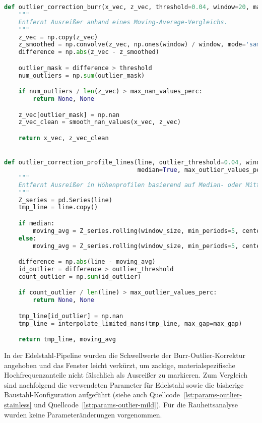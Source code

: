 \begin{lstlisting}[language=Python, caption={Outlier Detection/Correction in der Profilvorverarbeitung (Burr-Kanal)}, label={lst:outlier-correction}]
def outlier_correction_burr(x_vec, z_vec, threshold=0.04, window=20, max_nan_values_perc=0.4):
    """
    Entfernt Ausreißer anhand eines Moving-Average-Vergleichs.
    """
    z_vec = np.copy(z_vec)
    z_smoothed = np.convolve(z_vec, np.ones(window) / window, mode='same')
    difference = np.abs(z_vec - z_smoothed)

    outlier_mask = difference > threshold
    num_outliers = np.sum(outlier_mask)

    if num_outliers / len(z_vec) > max_nan_values_perc:
        return None, None

    z_vec[outlier_mask] = np.nan
    z_vec_clean = smooth_nan_values(x_vec, z_vec)

    return x_vec, z_vec_clean


def outlier_correction_profile_lines(line, outlier_threshold=0.04, window_size=30,
                                     median=True, max_outlier_values_perc=0.35, max_gap=5):
    """
    Entfernt Ausreißer in Höhenprofilen basierend auf Median- oder Mittelwert-Vergleich.
    """
    Z_series = pd.Series(line)
    tmp_line = line.copy()

    if median:
        moving_avg = Z_series.rolling(window_size, min_periods=5, center=True).median()
    else:
        moving_avg = Z_series.rolling(window_size, min_periods=5, center=True).mean()

    difference = np.abs(line - moving_avg)
    id_outlier = difference > outlier_threshold
    count_outlier = np.sum(id_outlier)

    if count_outlier / len(line) > max_outlier_values_perc:
        return None, None

    tmp_line[id_outlier] = np.nan
    tmp_line = interpolate_limited_nans(tmp_line, max_gap=max_gap)

    return tmp_line, moving_avg
\end{lstlisting}

In der Edelstahl-Pipeline wurden die Schwellwerte der Burr-Outlier-Korrektur angehoben und das Fenster leicht verkürzt, um zackige, materialspezifische Hochfrequenzanteile nicht fälschlich als Ausreißer zu markieren. Zum Vergleich sind nachfolgend die verwendeten Parameter für Edelstahl sowie die bisherige Baustahl-Konfiguration aufgeführt (siehe auch Quellcode~\ref{lst:params-outlier-stainless} und Quellcode~\ref{lst:params-outlier-mild}). Für die Rauheitsanalyse wurden keine Parameteränderungen vorgenommen.

